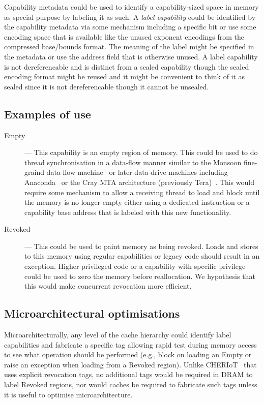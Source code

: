 Capability metadata could be used to identify a capability-sized space
in memory as special purpose by labeling it as such.  A \textit{label
  capability} could be identified by the capability metadata via some
mechanism including a specific bit or use some encoding space that is
available like the unused exponent encodings from the compressed
base/bounds format.  The meaning of the label might be specified in
the metadata or use the address field that is otherwise unused.  A
label capability is not dereferencable and is distinct from a sealed
capability though the sealed encoding format might be reused and it
might be convenient to think of it as sealed since it is not
dereferencable though it cannot be unsealed.

\subsection{Examples of use}

\begin{description}
  \item[Empty] --- This capability is an empty region of memory. This
    could be used to do thread synchronisation in a data-flow manner
    similar to the Monsoon fine-graind data-flow
    machine~\cite{Monsoon1990} or later data-drive machines including
    Anaconda~\cite{UCAM-CL-TR-358} or the Cray MTA architecture
    (previously Tera)~\cite{Tera1998}. This would require some
    mechanism to allow a receiving thread to load and block until the
    memory is no longer empty either using a dedicated instruction or
    a capability base address that is labeled with this new
    functionality.
  \item[Revoked] --- This could be used to paint memory as being
    revoked.  Loads and stores to this memory using regular
    capabilities or legacy code should result in an exception. Higher
    privileged code or a capability with specific privilege could be
    used to zero the memory before reallocation.  We hypothesis that
    this would make concurrent revocation more efficient.
\end{description}

\subsection{Microarchitectural optimisations}

Microarchitecturally, any level of the cache hierarchy could identify
label capabilities and fabricate a specific tag allowing rapid test
during memory access to see what operation should be performed (e.g.,
block on loading an Empty or raise an exception when loading from a
Revoked region).  Unlike CHERIoT~\cite{Amar:CHERIoT} that uses explicit revocation tags, no
additional tags would be required in DRAM to label Revoked regions,
nor would caches be required to fabricate such tags unless it is
useful to optimise microarchitecture.


